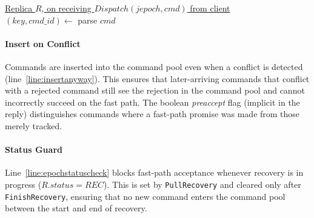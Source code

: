 \documentclass[twocolumn]{article}
\begin{document}
\begin{algorithm}
\caption{Server -- Witness Conflict Check (on $Dispatch$)}
\label{alg:command_pool_check}
\setcounter{AlgoLine}{10}

\underline{Replica $R$, on receiving $Dispatch(jepoch, cmd)$ from client}\\
$(key, cmd\_id) \gets$ parse $cmd$\\
\end{algorithm}

\paragraph{Insert on Conflict}
Commands are inserted into the command pool even when a conflict is detected (line~\ref{line:insertanyway}). This ensures that later-arriving commands that conflict with a rejected command still see the rejection in the command pool and cannot incorrectly succeed on the fast path. The boolean \emph{preaccept} flag (implicit in the reply) distinguishes commands where a fast-path promise was made from those merely tracked.

\paragraph{Status Guard}
Line~\ref{line:epochstatuscheck} blocks fast-path acceptance whenever recovery is in progress ($R.status = REC$). This is set by \texttt{PullRecovery} and cleared only after \texttt{FinishRecovery}, ensuring that no new command enters the command pool between the start and end of recovery.
\end{document}
